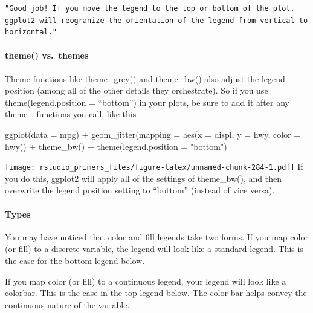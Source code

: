 \documentclass[
]{article}
\newenvironment{Shaded}{\begin{snugshade}}{\end{snugshade}}
\newcommand{\AttributeTok}[1]{\textcolor[rgb]{0.77,0.63,0.00}{#1}}
\newcommand{\FunctionTok}[1]{\textcolor[rgb]{0.00,0.00,0.00}{#1}}
\newcommand{\NormalTok}[1]{#1}
\newcommand{\SpecialCharTok}[1]{\textcolor[rgb]{0.00,0.00,0.00}{#1}}
\newcommand{\StringTok}[1]{\textcolor[rgb]{0.31,0.60,0.02}{#1}}
\begin{document}
\begin{verbatim}
"Good job! If you move the legend to the top or bottom of the plot, ggplot2 will reogranize the orientation of the legend from vertical to horizontal."
\end{verbatim}

\hypertarget{theme-vs.-themes}{%
\paragraph{theme() vs.~themes}\label{theme-vs.-themes}}

Theme functions like theme\_grey() and theme\_bw() also adjust the
legend position (among all of the other details they orchestrate). So if
you use theme(legend.position = ``bottom'') in your plots, be sure to
add it after any theme\_ functions you call, like this

\begin{Shaded}
\begin{Highlighting}[]
\FunctionTok{ggplot}\NormalTok{(}\AttributeTok{data =}\NormalTok{ mpg) }\SpecialCharTok{+} 
  \FunctionTok{geom\_jitter}\NormalTok{(}\AttributeTok{mapping =} \FunctionTok{aes}\NormalTok{(}\AttributeTok{x =}\NormalTok{ displ, }\AttributeTok{y =}\NormalTok{ hwy, }\AttributeTok{color =}\NormalTok{ hwy)) }\SpecialCharTok{+}
  \FunctionTok{theme\_bw}\NormalTok{() }\SpecialCharTok{+}
  \FunctionTok{theme}\NormalTok{(}\AttributeTok{legend.position =} \StringTok{"bottom"}\NormalTok{)}
\end{Highlighting}
\end{Shaded}

\texttt{[image: rstudio\_primers\_files/figure-latex/unnamed-chunk-284-1.pdf]}
If you do this, ggplot2 will apply all of the settings of theme\_bw(),
and then overwrite the legend position setting to ``bottom'' (instead of
vice versa).

\hypertarget{types-2}{%
\paragraph{Types}\label{types-2}}

You may have noticed that color and fill legends take two forms. If you
map color (or fill) to a discrete variable, the legend will look like a
standard legend. This is the case for the bottom legend below.

If you map color (or fill) to a continuous legend, your legend will look
like a colorbar. This is the case in the top legend below. The color bar
helps convey the continuous nature of the variable.
\end{document}

